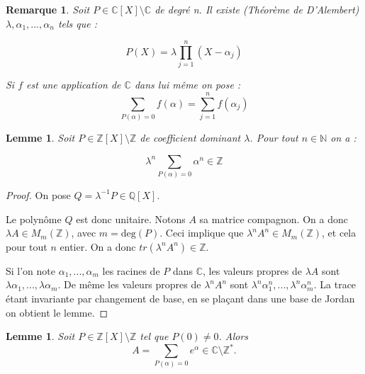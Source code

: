 \documentclass[12pt,a4paper]{report}
\newtheorem{lem}[thm]{\bf Lemme}
\newtheorem{rem}[thm]{Remarque}
\begin{document}
\begin{rem}\rm
Soit $P \in \mathbb{C}[X]\setminus \mathbb{C}$ de degré n. Il existe (Théorème de D'Alembert) $\lambda, \alpha_{1},...,\alpha_{n}$ tels que :

$$P(X)=\lambda \prod_{j=1}^{n} (X-\alpha_{j})$$

Si $f$ est une application de $\mathbb{C}$ dans lui même on pose : 
$$\sum_{P(\alpha)=0}f(\alpha)=\sum_{j=1}^{n}f(\alpha_{j})$$

\end{rem}

\begin{lem}\rm
Soit $P\in \mathbb{Z}[X] \setminus \mathbb{Z}$ de coefficient dominant $\lambda$. Pour tout $n\in \mathbb{N}$ on a : 

$$\lambda^{n}\sum_{P(\alpha)=0} \alpha^{n} \in \mathbb{Z}$$

\end{lem}


\begin{proof}
On pose $Q=\lambda^{-1}P\in \mathbb{Q}[X]$. 

Le polynôme $Q$ est donc unitaire. Notons $A$ sa matrice compagnon.
On a donc $\lambda A \in M_{m}(\mathbb{Z})$, avec $m=\text{deg}(P)$. Ceci implique que $\lambda^{n} A^{n} \in M_{m}(\mathbb{Z})$, et cela pour tout $n$ entier. On a donc $tr(\lambda^{n} A^{n}) \in \mathbb{Z}$. 

Si l'on note $\alpha_{1},...,\alpha_{m}$ les racines de $P$ dans $\mathbb{C}$, les valeurs propres de $\lambda A$ sont $\lambda \alpha_{1},...,\lambda \alpha_{m}$. De même les valeurs propres de $\lambda^{n} A^{n}$ sont $\lambda^{n} \alpha_{1}^{n},...,\lambda^{n} \alpha_{m}^{n}$. La trace étant invariante par changement de base, en se plaçant dans une base de Jordan on obtient le lemme.  


\end{proof}

\begin{lem}\rm
Soit $P\in \mathbb{Z}[X]\setminus \mathbb{Z}$ tel que $P(0)\neq 0$. Alors 
$$A=\sum_{P(\alpha)=0} e^{\alpha} \in \mathbb{C}\setminus \mathbb{Z}^{*}.$$

\end{lem}
\end{document}
